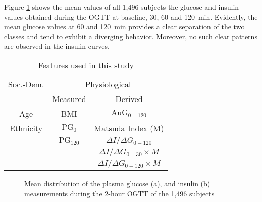 \documentclass[a4paper,twoside]{article}
\begin{document}
Figure \ref{fig:ogtt_mean} shows the mean values of all 1,496 subjects the glucose and insulin values obtained during the OGTT at baseline, 30, 60 and \SI{120}{\minute}. Evidently, the mean glucose values at 60 and \SI{120}{\minute} provides a clear separation of the two classes and tend to exhibit a diverging behavior. Moreover, no such clear patterns are observed in the insulin curves.
%
%
\begin{table}[!htbp]
\centering
\begin{tabular}{c c c}
\toprule
{Soc.-Dem.} & \multicolumn{2}{c}{Physiological}{} \\
\cmidrule{2-3}
& Measured & Derived \\
\midrule \midrule
Age & BMI & $\textrm{AuG}_{0-120}$ \\
Ethnicity & $\textrm{PG}_0$ & Matsuda Index (M)  \\
& $\textrm{PG}_{120}$ & \( {\Delta I}/{\Delta G}_{0-120} \)\\
& & \( {\Delta I}/{\Delta G}_{0-30} \times M \) \\
& & \( {\Delta I}/{\Delta G}_{0-120} \times M \) \\
\bottomrule
\end{tabular}
\caption{Features used in this study}
\label{tab:features}
\end{table}
%
%
\begin{figure}[!h]
  \centering
  \hfil
      \caption{Mean distribution of the plasma glucose (a), and insulin (b) measurements during the 2-hour OGTT of the 1,496 subjects}
    \label{fig:ogtt_mean}
\end{figure}
%
\end{document}

